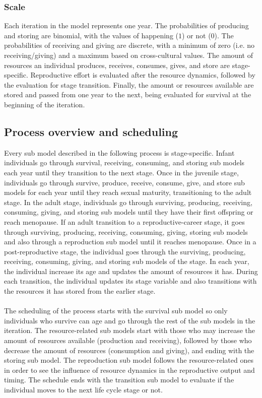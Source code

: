 \documentclass{article}
\begin{document}
\subsubsection{Scale}

Each iteration in the model represents one year. The probabilities  of producing and storing are binomial, with the values of happening ($1$) or not ($0$). The probabilities of receiving and giving are discrete, with a minimum of zero (i.e. no receiving/giving) and a maximum based on cross-cultural values. The amount of resources an individual produces, receives, consumes, gives, and store are stage-specific. Reproductive effort is evaluated after the resource dynamics, followed by the evaluation for stage transition. Finally, the amount or resources available are stored and passed from one year to the next, being evaluated for survival at the beginning of the iteration.

\subsection{Process overview and scheduling}

Every sub model described in the following process is stage-specific. Infant individuals go through survival, receiving, consuming, and storing sub models each year until they transition to the next stage. Once in the juvenile stage, individuals go through survive, produce, receive, consume, give, and store sub models for each year until they reach sexual maturity, transitioning to the adult stage. In the adult stage, individuals go through surviving, producing, receiving, consuming, giving, and storing sub models until they have their first offspring or reach menopause. If an adult transition to a reproductive-career stage, it goes through surviving, producing, receiving, consuming, giving, storing sub models and also through a reproduction sub model until it reaches menopause. Once in a post-reproductive stage, the individual goes through the surviving, producing, receiving, consuming, giving, and storing sub models of the stage. In each year, the individual increase its age and updates the amount of resources it has. During each transition, the individual updates its stage variable and also transitions with the resources it has stored from the earlier stage.
\\\\
The scheduling of the process starts with the survival sub model so only individuals who survive can age and go through the rest of the sub models in the iteration. The resource-related sub models start with those who may increase the amount of resources available (production and receiving), followed by those who decrease the amount of resources (consumption and giving), and ending with the storing sub model. The reproduction sub model follows the resource-related ones in order to see the influence of resource dynamics in the reproductive output and timing. The schedule ends with the transition sub model to evaluate if the individual moves to the next life cycle stage or not.
\end{document}
